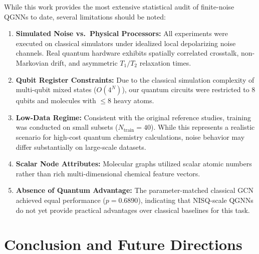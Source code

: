 \documentclass[sn-apacite,Numbered]{sn-jnl}
\begin{document}
While this work provides the most extensive statistical audit of finite-noise QGNNs to date, several limitations should be noted:
\begin{enumerate}
    \item \textbf{Simulated Noise vs.\ Physical Processors:} All experiments were executed on classical simulators under idealized local depolarizing noise channels. Real quantum hardware exhibits spatially correlated crosstalk, non-Markovian drift, and asymmetric $T_1/T_2$ relaxation times.
    \item \textbf{Qubit Register Constraints:} Due to the classical simulation complexity of multi-qubit mixed states ($O(4^N)$), our quantum circuits were restricted to 8 qubits and molecules with $\le 8$ heavy atoms.
    \item \textbf{Low-Data Regime:} Consistent with the original reference studies, training was conducted on small subsets ($N_{\text{train}} = 40$). While this represents a realistic scenario for high-cost quantum chemistry calculations, noise behavior may differ substantially on large-scale datasets.
    \item \textbf{Scalar Node Attributes:} Molecular graphs utilized scalar atomic numbers rather than rich multi-dimensional chemical feature vectors.
    \item \textbf{Absence of Quantum Advantage:} The parameter-matched classical GCN achieved equal performance ($p = 0.6890$), indicating that NISQ-scale QGNNs do not yet provide practical advantages over classical baselines for this task.
\end{enumerate}

\section{Conclusion and Future Directions}\label{sec:conclusion}
\end{document}
